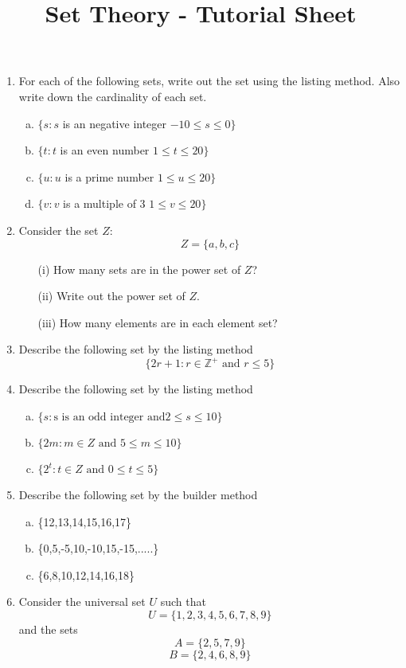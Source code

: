 \documentclass[]{article}
\title{Set Theory - Tutorial Sheet}
\begin{document}
\begin{enumerate}
\item 
For each of the following sets, write out the set using the listing method.
Also write down the cardinality of each set.

\begin{enumerate}[(a)]
\item $\{ s : s $ is an negative integer $ -10 \leq s \leq 0 \}$
\item $\{ t : t $ is an even number $ 1 \leq t \leq 20 \}$
\item $\{ u : u $ is a prime number $ 1 \leq u \leq 20 \}$
\item $\{ v : v $ is a multiple of 3 $ 1 \leq v \leq 20 \}$
\end{enumerate}
\item 
Consider the set $Z$:
\[ Z = \{ a,b,c\}  \]
\begin{itemize}
\item[(i)] How many sets are in the power set of $Z$? 
\item[(ii)] Write out the power set of $Z$. 
\item[(iii)] How many elements are in each element set?
\end{itemize}
\item Describe the following set by the listing method
\[ \{ 2r+1 : r \in \mathbb{Z^{+}} \mbox{ and } r \leq 5  \} \]
\item Describe the following set by the listing method
\begin{enumerate}[(a)]
\item $\{ s :  \mbox{s is an odd integer and} 2 \leq s \leq 10 \}$
\item $\{ 2m :  m \in Z \mbox{ and } 5 \leq m \leq 10 \}$
\item $\{ 2^t :  t \in Z \mbox{ and } 0 \leq t \leq 5 \}$
\end{enumerate}
\item Describe the following set by the builder method
\begin{enumerate}[(a)]
\item \{12,13,14,15,16,17\}
\item \{0,5,-5,10,-10,15,-15,.....\}
\item \{6,8,10,12,14,16,18\}
\end{enumerate}


\item Consider the universal set $U$ such that
\[U=\{1,2,3,4,5,6,7,8,9\} \] 
and the sets
\[A=\{2,5,7,9\} \] 
\[B=\{2,4,6,8,9\} \]


\end{enumerate}
\end{document}
